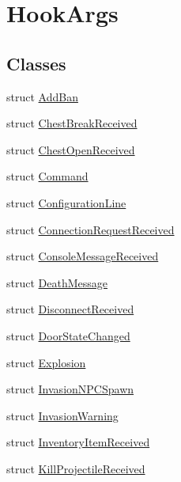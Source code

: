 \hypertarget{classOTA_1_1Plugin_1_1HookArgs}{}\section{Hook\+Args}
\label{classOTA_1_1Plugin_1_1HookArgs}
\subsection*{Classes}
\begin{DoxyCompactItemize}
\item 
struct \hyperlink{structOTA_1_1Plugin_1_1HookArgs_1_1AddBan}{Add\+Ban}
\item 
struct \hyperlink{structOTA_1_1Plugin_1_1HookArgs_1_1ChestBreakReceived}{Chest\+Break\+Received}
\item 
struct \hyperlink{structOTA_1_1Plugin_1_1HookArgs_1_1ChestOpenReceived}{Chest\+Open\+Received}
\item 
struct \hyperlink{structOTA_1_1Plugin_1_1HookArgs_1_1Command}{Command}
\item 
struct \hyperlink{structOTA_1_1Plugin_1_1HookArgs_1_1ConfigurationLine}{Configuration\+Line}
\item 
struct \hyperlink{structOTA_1_1Plugin_1_1HookArgs_1_1ConnectionRequestReceived}{Connection\+Request\+Received}
\item 
struct \hyperlink{structOTA_1_1Plugin_1_1HookArgs_1_1ConsoleMessageReceived}{Console\+Message\+Received}
\item 
struct \hyperlink{structOTA_1_1Plugin_1_1HookArgs_1_1DeathMessage}{Death\+Message}
\item 
struct \hyperlink{structOTA_1_1Plugin_1_1HookArgs_1_1DisconnectReceived}{Disconnect\+Received}
\item 
struct \hyperlink{structOTA_1_1Plugin_1_1HookArgs_1_1DoorStateChanged}{Door\+State\+Changed}
\item 
struct \hyperlink{structOTA_1_1Plugin_1_1HookArgs_1_1Explosion}{Explosion}
\item 
struct \hyperlink{structOTA_1_1Plugin_1_1HookArgs_1_1InvasionNPCSpawn}{Invasion\+N\+P\+C\+Spawn}
\item 
struct \hyperlink{structOTA_1_1Plugin_1_1HookArgs_1_1InvasionWarning}{Invasion\+Warning}
\item 
struct \hyperlink{structOTA_1_1Plugin_1_1HookArgs_1_1InventoryItemReceived}{Inventory\+Item\+Received}
\item 
struct \hyperlink{structOTA_1_1Plugin_1_1HookArgs_1_1KillProjectileReceived}{Kill\+Projectile\+Received}

\end{DoxyCompactItemize}

